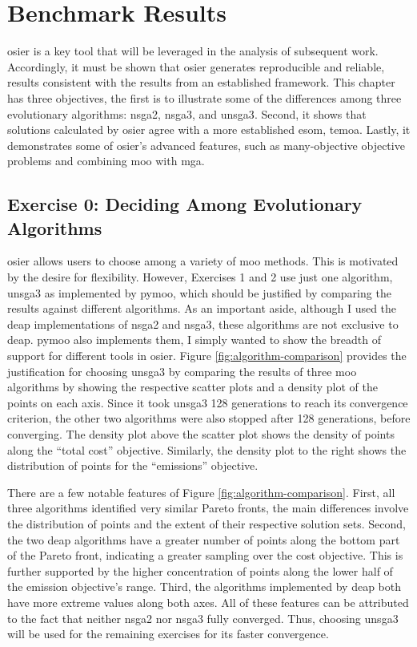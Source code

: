 \chapter{Benchmark Results}
\label{chapter:benchmark-results}
\ac{osier} is a key tool that will be leveraged in the analysis of subsequent
work. Accordingly, it must be shown that \ac{osier} generates reproducible and
reliable, results consistent with the results from an established framework.
This chapter has three objectives, the first is to illustrate some of the
differences among three evolutionary algorithms: \ac{nsga2}, \ac{nsga3}, and
\ac{unsga3}. Second, it shows that solutions calculated by \ac{osier} agree with
a more established \ac{esom}, \ac{temoa}. Lastly, it demonstrates some of
\ac{osier}'s advanced features, such as many-objective objective problems and
combining \ac{moo} with \ac{mga}.

\section{Exercise 0: Deciding Among Evolutionary Algorithms}

\ac{osier} allows users to choose among a variety of \ac{moo} methods. This is
motivated by the desire for flexibility. However, Exercises 1 and 2 use just one
algorithm, \ac{unsga3} as implemented by \ac{pymoo}, which should be justified
by comparing the results against different algorithms. As an important aside,
although I used the \ac{deap} implementations of \ac{nsga2} and \ac{nsga3},
these algorithms are not exclusive to \ac{deap}. \ac{pymoo} also implements
them, I simply wanted to show the breadth of support for different tools in
\ac{osier}. Figure \ref{fig:algorithm-comparison} provides the justification for
choosing \ac{unsga3} by comparing the results of three \ac{moo} algorithms by
showing the respective scatter plots and a density plot of the points on each
axis. Since it took \ac{unsga3} 128 generations to reach its convergence
criterion, the other two algorithms were also stopped after 128 generations,
before converging. The density plot above the scatter plot shows the density of
points along the ``total cost'' objective. Similarly, the density plot to the
right shows the distribution of points for the ``emissions'' objective.

There are a few notable features of Figure \ref{fig:algorithm-comparison}.
First, all three algorithms identified very similar Pareto fronts, the main
differences involve the distribution of points and the extent of their
respective solution sets. Second, the two \ac{deap} algorithms have a greater
number of points along the bottom part of the Pareto front, indicating a greater
sampling over the cost objective. This is further supported by the higher
concentration of points along the lower half of the emission objective's range.
Third, the algorithms implemented by \ac{deap} both have more extreme values
along both axes. All of these features can be attributed to the fact that
neither \ac{nsga2} nor \ac{nsga3} fully converged. Thus, choosing \ac{unsga3}
will be used for the remaining exercises for its faster convergence.


